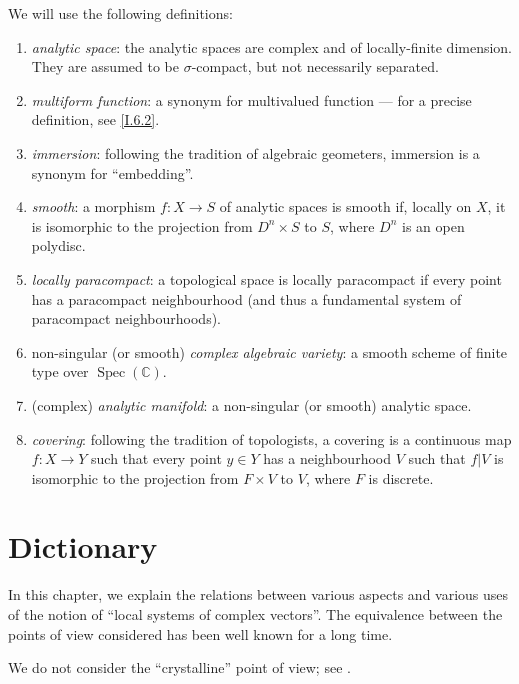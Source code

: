 \documentclass{report}
\theoremstyle{plain}
\theoremstyle{definition}
\DeclareMathOperator{\Spec}{Spec}
\newcommand{\oldpage}[1]{\marginpar{\footnotesize$\Big\vert$ \textit{p.~#1}}}
\begin{document}
We will use the following definitions:
\begin{enumerate}[({0.}1)]
  \item\label{0.1}
    \emph{analytic space}:
    the analytic spaces are complex and of locally-finite dimension.
    They are assumed to be $\sigma$-compact, but not necessarily separated.
  \item\label{0.2}
    \emph{multiform function}:
    a synonym for multivalued function --- for a precise definition, see \cref{I.6.2}.
  \item\label{0.3}
    \emph{immersion}:
    following the tradition of algebraic geometers, immersion is a synonym for ``embedding''.
  \item\label{0.4}
    \emph{smooth}:
    a morphism $f\colon X\to S$ of analytic spaces is smooth if, locally on $X$, it is isomorphic to the projection from $D^n\times S$ to $S$, where $D^n$ is an open polydisc.
  \item\label{0.5}
    \emph{locally paracompact}:
    a topological space is locally paracompact if every point has a paracompact neighbourhood (and thus a fundamental system of paracompact neighbourhoods).
  \item\label{0.6}
    non-singular (or smooth) \emph{complex algebraic variety}:
    a smooth scheme of finite type over $\Spec(\mathbb{C})$.
  \item\label{0.7}
    (complex) \emph{analytic manifold}:
    a non-singular (or smooth) analytic space.
  \item\label{0.8}
    \emph{covering}:
    following the tradition of topologists, a covering is a continuous map $f\colon X\to Y$ such that every point $y\in Y$ has a neighbourhood $V$ such that $f|V$ is isomorphic to the projection from $F\times V$ to $V$, where $F$ is discrete.
\end{enumerate}


\renewcommand{\thechapter}{\Roman{chapter}}

\chapter{Dictionary}
\label{I}

\oldpage{3}
In this chapter, we explain the relations between various aspects and various uses of the notion of ``local systems of complex vectors''.
The equivalence between the points of view considered has been well known for a long time.

We do not consider the ``crystalline'' point of view;
see \cite{4,10}.
\end{document}
